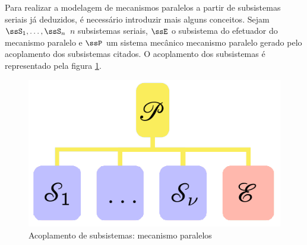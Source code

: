 \documentclass[]{politex}
\begin{document}
Para realizar a modelagem de mecanismos paralelos a partir de subsistemas seriais j\'a deduzidos, \'e necess\'ario introduzir mais alguns conceitos. Sejam $\ssS_1, \hdots, \ssS_{n}$ $n$ subsistemas seriais, $\ssE$ o subsistema do efetuador do mecanismo paralelo e $\ssP$ um sistema mecânico mecanismo paralelo gerado pelo acoplamento dos subsistemas citados. O acoplamento dos subsistemas é representado pela figura \ref{fig:AcoplamentoMecParalelo}.
\begin{figure}[h]
	\centering
	\includegraphics[scale=0.42]{imagens/DiagramaAcoplamentoMecParalelos.png}  
	\caption{Acoplamento de subsistemas: mecanismo paralelos}
	\label{fig:AcoplamentoMecParalelo}
\end{figure}
\end{document}
